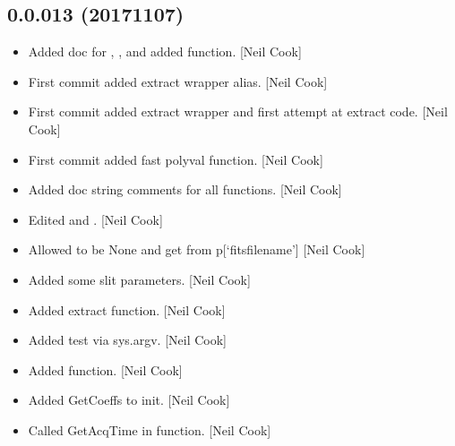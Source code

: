 \documentclass[a4paper,10pt,english]{report}
\begin{document}
\subsection{0.0.013 (2017\sphinxhyphen{}11\sphinxhyphen{}07)}
\label{\detokenize{misc/changelog:id556}}\begin{itemize}
\item {} 
Added doc for , ,
 and  added
 function. {[}Neil Cook{]}

\item {} 
First commit \sphinxhyphen{} added extract wrapper alias. {[}Neil Cook{]}

\item {} 
First commit \sphinxhyphen{} added extract wrapper and first attempt at extract
code. {[}Neil Cook{]}

\item {} 
First commit \sphinxhyphen{} added fast polyval function. {[}Neil Cook{]}

\item {} 
Added doc string comments for all functions. {[}Neil Cook{]}

\item {} 
Edited  and . {[}Neil Cook{]}

\item {} 
Allowed  to be None and get  from p{[}‘fitsfilename’{]}
{[}Neil Cook{]}

\item {} 
Added some slit parameters. {[}Neil Cook{]}

\item {} 
Added extract function. {[}Neil Cook{]}

\item {} 
Added test via sys.argv. {[}Neil Cook{]}

\item {} 
Added  function. {[}Neil Cook{]}

\item {} 
Added GetCoeffs to init. {[}Neil Cook{]}

\item {} 
Called GetAcqTime in  function. {[}Neil Cook{]}


\end{itemize}
\end{document}
